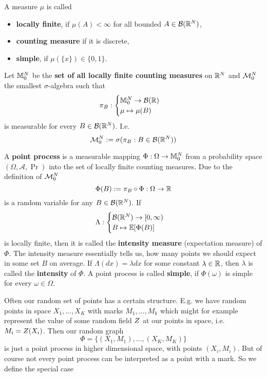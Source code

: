 A measure \(\mu\) is called
\begin{itemize}
	\item \textbf{locally finite}, if \(\mu(A) < \infty\) for all bounded
	\(A\in\mathcal{B}(\mathbb{R}^N)\),
	\item \textbf{counting measure} if it is discrete,
	\item \textbf{simple}, if \(\mu(\{x\})\in\{0,1\}\).
\end{itemize}
Let \(\mathbb{M}^{N}_0\) be the \textbf{set of all locally finite counting measures}
on \(\mathbb{R}^N\) and \(\mathcal{M}^{N}_0\) the smallest \(\sigma\)-algebra
such that
\[
	\pi_B : \begin{cases}
		\mathbb{M}^{N}_0 \to \mathcal{B}(\mathbb{R})\\
		\mu \mapsto \mu(B)
	\end{cases}
\]
is measurable for every \(B\in\mathcal{B}(\mathbb{R}^N)\). I.e.
\[
	\mathcal{M}^{N}_0 := \sigma(\pi_B : B\in\mathcal{B}(\mathbb{R}^N))
\]

\begin{definition}
	A \textbf{point process} is a measurable mapping \(\Phi:\Omega\to\mathbb{M}^{N}_0\)
	from a probability space \((\Omega, \mathcal{A}, \Pr)\) into the set of
	locally finite counting measures. Due to the definition of \(\mathcal{M}^{N}_0\)
	\[
		\Phi(B) := \pi_B\circ \Phi : \Omega \to \mathbb{R}
	\]
	is a random variable for any \(B\in\mathcal{B}(\mathbb{R}^N)\). If
	\[
		\Lambda:\begin{cases}
			\mathcal{B}(\mathbb{R}^N)\to [0,\infty)\\
			B \mapsto \mathbb{E}[\Phi(B)]
		\end{cases}
	\]
	is locally finite, then it is called the \textbf{intensity measure}
	(expectation measure) of \(\Phi\). The intensity measure essentially tells
	us, how many points we should expect in some set \(B\) on average.
	If \(\Lambda(dx) = \lambda dx\) for some
	constant \(\lambda\in\mathbb{R}\), then \(\lambda\) is called the
	\textbf{intensity} of \(\Phi\).
	A point process is called \textbf{simple}, if \(\Phi(\omega)\) is simple
	for every \(\omega\in\Omega\).
\end{definition}

Often our random set of points has a certain structure. E.g. we have
random points in space \(X_1,\dots, X_K\) with marks \(M_1,\dots, M_k\) which
might for example represent the value of some random field \(Z\) at our
points in space, i.e. \(M_i=Z(X_i)\). Then our random graph 
\[
	\Phi = \{ (X_1, M_1), \dots, (X_K, M_K) \}
\]
is just a point process in higher dimensional space, with points \((X_i, M_i)\).
But of course not every point process can be interpreted as a point with a mark.
So we define the special case

